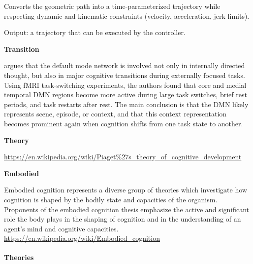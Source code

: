 \documentclass{book}
\providecommand{\ProjectDeepHeading}[2]{%
    \par\medskip\noindent\textbf{#2}\par\smallskip
}
\begin{document}

Converts the geometric path into a time-parameterized trajectory while respecting dynamic and kinematic constraints (velocity, acceleration, jerk limits).
    
    Output: a trajectory that can be executed by the controller.

\ProjectDeepHeading{3}{Transition}


\cite{smith-2018-role-of-the-default-mode-network-in-cognitive-transitions} argues that the default mode network is involved not only in internally directed thought, but also in major cognitive transitions during externally focused tasks.
    Using fMRI task-switching experiments, the authors found that core and medial temporal DMN regions become more active during large task switches, brief rest periods, and task restarts after rest.
    The main conclusion is that the DMN likely represents scene, episode, or context, and that this context representation becomes prominent again when cognition shifts from one task state to another.

\ProjectDeepHeading{1}{Theory}


\url{https://en.wikipedia.org/wiki/Piaget%27s_theory_of_cognitive_development}
    \\
    \url{}

\ProjectDeepHeading{2}{Embodied}


Embodied cognition represents a diverse group of theories which investigate how cognition is shaped by the bodily state and capacities of the organism. Proponents of the embodied cognition thesis emphasize the active and significant role the body plays in the shaping of cognition and in the understanding of an agent's mind and cognitive capacities.
    \url{https://en.wikipedia.org/wiki/Embodied_cognition}
    

\paragraph{Theories}
\end{document}
